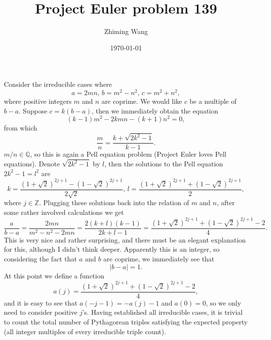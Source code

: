 %



\title{Project Euler problem 139}
\author{Zhiming Wang}
\date{\today}



\maketitle

Consider the irreducible cases where
\[
a = 2mn,\, b = m^2 - n^2,\, c = m^2 + n^2,
\]
where positive integers $m$ and $n$ are coprime. We would like $c$ be
a multiple of $b - a$. Suppose $c = k(b - a)$, then we immediately
obtain the equation
\[
(k-1)m^2 - 2kmn - (k+1)n^2 = 0,
\]
from which
\[
\frac{m}{n} = \frac{k + \sqrt{2k^2-1}}{k - 1}.
\]
$m/n \in \mathbb{Q}$, so this is again a Pell equation problem
(Project Euler loves Pell equations). Denote $\sqrt{2k^2-1}$ by $l$,
then the solutions to the Pell equation $2k^2 - 1 = l^2$ are
\[
k = \frac{(1+\sqrt{2})^{2j+1} - (1-\sqrt{2})^{2j+1}}{2\sqrt{2}},\,
l = \frac{(1+\sqrt{2})^{2j+1} + (1-\sqrt{2})^{2j+1}}{2},
\]
where $j \in \mathbb{Z}$. Plugging these solutions back into the
relation of $m$ and $n$, after some rather involved calculations we
get
\[
\frac{a}{b-a}
= \frac{2mn}{m^2 - n^2 - 2mn}
= \frac{2(k+l)(k-1)}{2k+l-1}
= \frac{(1+\sqrt{2})^{2j+1} + (1-\sqrt{2})^{2j+1} - 2}{4}.
\]
This is very nice and rather surprising, and there must be an elegant
explanation for this, although I didn't think deeper. Apparently this
is an integer, so considering the fact that $a$ and $b$ are coprime,
we immediately see that
\[
|b - a| = 1.
\]
At this point we define a function
\[
a(j) = \frac{(1+\sqrt{2})^{2j+1} + (1-\sqrt{2})^{2j+1} - 2}{4},
\]
and it is easy to see that $a(-j-1) = -a(j)-1$ and $a(0) = 0$, so we
only need to consider positive $j$'s. Having established all
irreducible cases, it is trivial to count the total number of
Pythagorean triples satisfying the expected property (all integer
multiples of every irreducible triple count).


